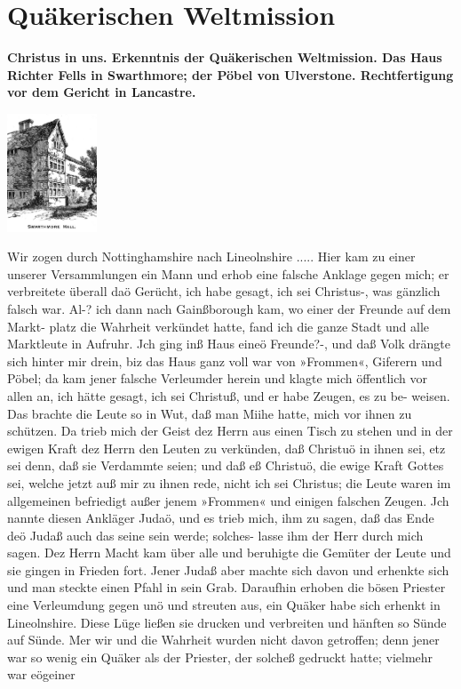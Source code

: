 
\chapter[Quäkerischen Weltmission]{Quäkerischen Weltmission}

\begin{center}
\textbf{Christus in uns. Erkenntnis der Quäkerischen Weltmission. Das
Haus Richter Fells in Swarthmore; der Pöbel von Ulverstone.
Rechtfertigung vor dem Gericht in Lancastre.}
\end{center}



\begin{floatingfigure}[3]{4cm}
\includegraphics[width=0.20\textwidth]{./pics/swarthmore_hall.png}
\label{bild:swarthmoor} 
\end{floatingfigure}



Wir zogen durch Nottinghamshire nach Lineolnshire .....
Hier kam zu einer unserer Versammlungen ein Mann und erhob eine
falsche Anklage gegen mich; er verbreitete überall daö Gerücht, ich
habe gesagt, ich sei Christus-, was gänzlich falsch war. Al-? ich dann
nach Gainßborough kam, wo einer der Freunde auf dem Markt-
platz die Wahrheit verkündet hatte, fand ich die ganze Stadt und
alle Marktleute in Aufruhr. Jch ging inß Haus eineö Freunde?-,
und daß Volk drängte sich hinter mir drein, biz das Haus ganz
voll war von »Frommen«, Giferern und Pöbel; da kam jener
falsche Verleumder herein und klagte mich öffentlich vor allen an,
ich hätte gesagt, ich sei Christuß, und er habe Zeugen, es zu be-
weisen. Das brachte die Leute so in Wut, daß man Miihe hatte,
mich vor ihnen zu schützen. Da trieb mich der Geist dez Herrn
aus einen Tisch zu stehen und in der ewigen Kraft dez Herrn
den Leuten zu verkünden, daß Christuö in ihnen sei, etz sei denn,
daß sie Verdammte seien; und daß eß Christuö, die ewige Kraft
Gottes sei, welche jetzt auß mir zu ihnen rede, nicht ich sei Christus;
die Leute waren im allgemeinen befriedigt außer jenem »Frommen«
und einigen falschen Zeugen. Jch nannte diesen Ankläger Judaö,
und es trieb mich, ihm zu sagen, daß das Ende deö Judaß auch
das seine sein werde; solches- lasse ihm der Herr durch mich sagen.
Dez Herrn Macht kam über alle und beruhigte die Gemüter der
Leute und sie gingen in Frieden fort. Jener Judaß aber machte
sich davon und erhenkte sich und man steckte einen Pfahl in sein
Grab. Daraufhin erhoben die bösen Priester eine Verleumdung
gegen unö und streuten aus, ein Quäker habe sich erhenkt in
Lineolnshire. Diese Lüge ließen sie drucken und verbreiten und
hänften so Sünde auf Sünde. Mer wir und die Wahrheit wurden
nicht davon getroffen; denn jener war so wenig ein Quäker als
der Priester, der solcheß gedruckt hatte; vielmehr war eögeiner


